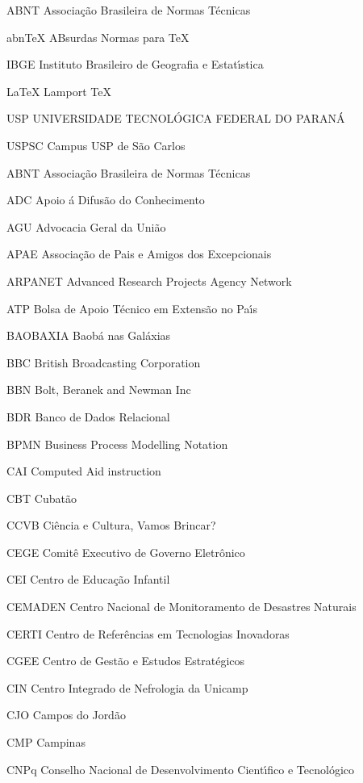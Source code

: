 \begin{siglas}
    \item[ABNT] Associa\c{c}\~ao Brasileira de Normas T\'ecnicas
    \item[abnTeX] ABsurdas Normas para TeX
	\item[IBGE] Instituto Brasileiro de Geografia e Estat\'{\i}stica
	\item[LaTeX] Lamport TeX
	\item[USP] UNIVERSIDADE TECNOL\'OGICA FEDERAL DO PARAN\'A
	\item[USPSC] Campus USP de S\~ao Carlos
\item[ABNT] Associa\c{c}\~ao Brasileira de Normas T\'ecnicas
\item[ADC] Apoio \'a Difus\~ao do Conhecimento
\item[AGU] Advocacia Geral da Uni\~ao
\item[APAE] Associa\c{c}\~ao de Pais e Amigos dos Excepcionais 
\item[ARPANET] Advanced Research Projects Agency Network
\item[ATP] Bolsa de Apoio T\'ecnico em Extens\~ao no Pa\'{\i}s  
\item[BAOBAXIA] Baob\'a nas Gal\'axias
\item[BBC] British Broadcasting Corporation
\item[BBN] Bolt, Beranek and Newman Inc
\item[BDR] Banco de Dados Relacional	
\item[BPMN] Business Process Modelling Notation
\item[CAI] Computed Aid instruction
\item[CBT] Cubat\~ao
\item[CCVB] Ci\^encia e Cultura, Vamos Brincar?
\item[CEGE] Comit\^e Executivo de Governo Eletr\^onico
\item[CEI] Centro de Educa\c{c}\~ao Infantil
\item[CEMADEN] Centro Nacional de Monitoramento de Desastres Naturais
\item[CERTI] Centro de Refer\^encias em Tecnologias Inovadoras
\item[CGEE] Centro de Gest\~ao e Estudos Estrat\'egicos
\item[CIN] Centro Integrado de Nefrologia da Unicamp
\item[CJO] Campos do Jord\~ao
\item[CMP] Campinas
\item[CNPq] Conselho Nacional de Desenvolvimento Cient\'{\i}fico e Tecnol\'ogico

\end{siglas}
